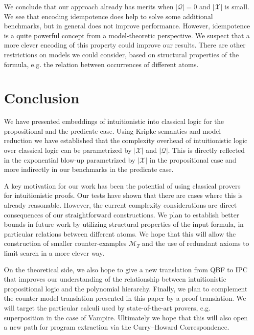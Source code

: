 \documentclass[runningheads]{llncs}
\begin{document}
We conclude that our approach already has merits when $|\mathcal Q| = 0$ and $|\mathcal X|$ is small. 
We see that encoding idempotence does help to solve some additional benchmarks, but in general does not improve performance.
However, idempotence is a quite powerful concept from a model-theoretic perspective. We suspect that a more clever encoding of this property could improve our results. There are other restrictions on models we could consider, based on structural properties of the formula, e.g. the relation between occurrences of different atoms.

\section{Conclusion}

We have presented embeddings of intuitionistic into classical logic for the propositional and the predicate case. Using Kripke semantics and model reduction we have established that the complexity overhead of intuitionistic logic over classical logic can be parametrized by $|\mathcal X|$ and $|\mathcal Q|$. This is directly reflected in the exponential blow-up parametrized by $|\mathcal X|$ in the propositional case and more indirectly in our benchmarks in the predicate case.

A key motivation for our work has been the potential of using classical provers for intuitionistic proofs. Our tests have shown that there are cases where this is already reasonable.
However, the current complexity considerations are direct consequences of our straightforward constructions. We plan to establish better bounds in future work by utilizing structural properties of the input formula, in particular relations between different atoms. We hope that this will allow the construction of smaller counter-examples $\mathcal M_T$ and the use of redundant axioms to limit search in a more clever way.

On the theoretical side, we also hope to give a new translation from QBF to IPC that improves our understanding of the relationship between intuitionistic propositional logic and the polynomial hierarchy.
Finally, we plan to complement the counter-model translation presented in this paper by a proof translation.
We will target the particular calculi used by state-of-the-art provers, e.g. superposition in the case of Vampire. Ultimately we hope that this will also open a new path for program extraction via the Curry--Howard Correspondence.



\end{document}
